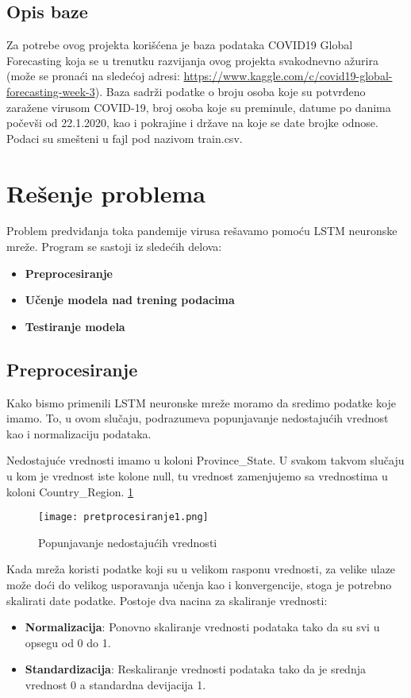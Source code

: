 \documentclass[a4paper]{article}
\begin{document}
\subsection{Opis baze}
Za potrebe ovog projekta korišćena je baza podataka COVID19 Global Forecasting koja se u trenutku razvijanja ovog projekta svakodnevno ažurira (može se pronaći na sledećoj adresi: \url{https://www.kaggle.com/c/covid19-global-forecasting-week-3}). Baza sadrži podatke o broju osoba koje su potvrđeno zaražene virusom COVID-19, broj osoba koje su preminule, datume po danima počevši od 22.1.2020, kao i pokrajine i države na koje se date brojke odnose. Podaci su smešteni u fajl pod nazivom train.csv. 
\section{Rešenje problema}
Problem predviđanja toka pandemije virusa rešavamo pomoću LSTM neuronske mreže. Program se sastoji iz sledećih delova:
\begin{itemize}
    \item \textbf{Preprocesiranje}
    \item \textbf{Učenje modela nad trening podacima}
    \item \textbf{Testiranje modela}
\end{itemize}


\subsection{Preprocesiranje}
Kako bismo primenili LSTM neuronske mreže moramo da sredimo podatke koje imamo. To, u ovom slučaju, podrazumeva popunjavanje nedostajućih vrednost kao i normalizaciju podataka.


Nedostajuće vrednosti imamo u koloni Province\_State. U svakom takvom slučaju u kom je vrednost iste kolone null, tu vrednost zamenjujemo sa vrednostima u koloni Country\_Region.  \ref{fig:Pretprocesiranje1}
\begin{figure}[htp]
    \centering
    \texttt{[image: pretprocesiranje1.png]}
    \caption{Popunjavanje nedostajućih vrednosti}
    \label{fig:Pretprocesiranje1}
\end{figure}

Kada mreža koristi podatke koji su u velikom rasponu vrednosti, za velike ulaze može doći do velikog usporavanja učenja kao i konvergencije, stoga je potrebno skalirati date podatke. Postoje dva nacina za skaliranje vrednosti:

\begin{itemize}
    \item \textbf{Normalizacija}: Ponovno skaliranje vrednosti podataka tako da su svi u opsegu od 0 do 1.
    \item \textbf{Standardizacija}: Reskaliranje vrednosti podataka tako da je srednja vrednost 0 a standardna devijacija 1.
\end{itemize}
\end{document}

